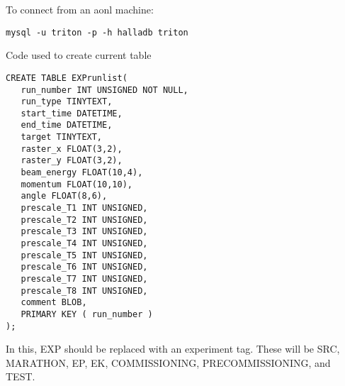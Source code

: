 \documentclass[10pt]{article}
\begin{document}
To connect from an aonl machine:
\begin{verbatim}
mysql -u triton -p -h halladb triton
\end{verbatim}

Code used to create current table

\begin{verbatim}
CREATE TABLE EXPrunlist(
   run_number INT UNSIGNED NOT NULL,
   run_type TINYTEXT,
   start_time DATETIME,
   end_time DATETIME,
   target TINYTEXT,
   raster_x FLOAT(3,2),
   raster_y FLOAT(3,2),
   beam_energy FLOAT(10,4),
   momentum FLOAT(10,10),
   angle FLOAT(8,6),
   prescale_T1 INT UNSIGNED,
   prescale_T2 INT UNSIGNED,
   prescale_T3 INT UNSIGNED,
   prescale_T4 INT UNSIGNED,
   prescale_T5 INT UNSIGNED,
   prescale_T6 INT UNSIGNED,
   prescale_T7 INT UNSIGNED,
   prescale_T8 INT UNSIGNED,
   comment BLOB,
   PRIMARY KEY ( run_number )
);
\end{verbatim}

In this, EXP should be replaced with an experiment tag. These will be SRC, MARATHON, EP, EK, COMMISSIONING, PRECOMMISSIONING, and TEST. 
\end{document}
